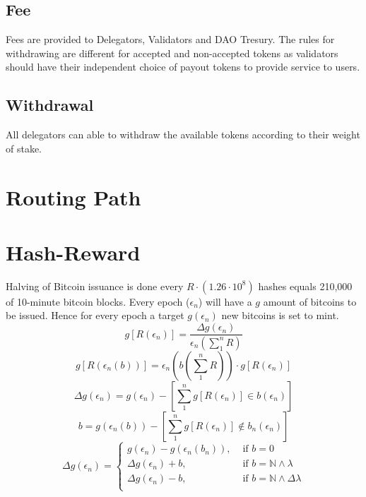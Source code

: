 \documentclass[a4paper,10pt]{article}
\begin{document}
\subsection{Fee}
Fees are provided to Delegators, Validators and DAO Tresury. The rules for withdrawing are different for accepted and non-accepted tokens as validators should have their independent choice of payout tokens to provide service to users.
\subsection{Withdrawal}
All delegators can able to withdraw the available tokens according to their weight of stake.

\section{Routing Path}

\section{Hash-Reward}
Halving of Bitcoin issuance is done every $R \cdot (1.26 \cdot 10^8)$ hashes equals 210,000 of 10-minute bitcoin blocks. Every epoch ($\epsilon_n$) will have a $g$ amount of bitcoins to be issued. Hence for every epoch a target $g(\epsilon_n)$ new bitcoins is set to mint. 
\begin{equation*}
g[R(\epsilon_n)] = \frac{\Delta g(\epsilon_n)}{\epsilon_n(\sum_1^n R)}
\end{equation*}
\begin{equation*}
g[R(\epsilon_n(b))] = \epsilon_n(b(\sum_1^n R)) \cdot g[R(\epsilon_n)]
\end{equation*}
\begin{equation*}
\Delta g(\epsilon_n) = g(\epsilon_n) - [\sum_1^n g[R(\epsilon_n)]  \in b(\epsilon_n)]
\end{equation*}
\begin{equation*}
b = g(\epsilon_n(b)) - [\sum_1^n g[R(\epsilon_n)]  \not\in b_n(\epsilon_n)]
\end{equation*}
\begin{equation*}
\Delta g(\epsilon_n) = 
\begin{cases}
g(\epsilon_n) - g(\epsilon_n(b_n)), & \text{ if } b =  0 \\
\Delta g(\epsilon_n) + b, & \text{ if } b = \mathbb{N} \wedge \lambda  \\
\Delta g(\epsilon_n) - b, & \text{ if } b =  \mathbb{N} \wedge \Delta \lambda \\
\end{cases}
\end{equation*}
\end{document}
